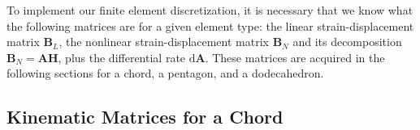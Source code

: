 To implement our finite element discretization, it is necessary that we know what the following matrices are for a given element type: the linear strain-displacement matrix $\mathbf{B}_L$, the nonlinear strain-displacement matrix $\mathbf{B}_N$ and its decomposition $\mathbf{B}_N = \mathbf{AH}$, plus the differential rate $\mathrm{d}\mathbf{A}$.  These matrices are acquired in the following sections for a chord, a pentagon, and a dodecahedron.




























\subsection{Kinematic Matrices for a Chord}

